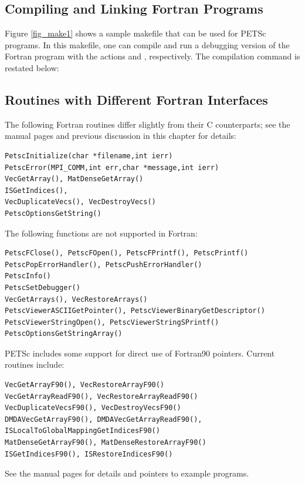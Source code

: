 \subsection{Compiling and Linking Fortran Programs}
\label{sec_fortcompile}

Figure \ref{fig_make1} shows a sample makefile that can be used for
PETSc programs.  In this makefile, one can compile and run a debugging version
of the Fortran program  with the actions    and
 , respectively. The compilation command is restated below:
\begin{makelisting}
ex3: ex3.o
       -${FLINKER}} -o ex3 ex3.o ${PETSC_LIB}
        ${RM} ex3.o
\end{makelisting}

\subsection{Routines with Different Fortran Interfaces}
\label{sec_fortran_exceptions}

The following Fortran routines differ slightly from their C counterparts; see the
manual pages and previous discussion in this chapter for details:
\begin{lstlisting}
PetscInitialize(char *filename,int ierr)
PetscError(MPI_COMM,int err,char *message,int ierr)
VecGetArray(), MatDenseGetArray()
ISGetIndices(),
VecDuplicateVecs(), VecDestroyVecs()
PetscOptionsGetString()
\end{lstlisting}
The following functions are not supported in Fortran:
\begin{lstlisting}
PetscFClose(), PetscFOpen(), PetscFPrintf(), PetscPrintf()
PetscPopErrorHandler(), PetscPushErrorHandler()
PetscInfo()
PetscSetDebugger()
VecGetArrays(), VecRestoreArrays()
PetscViewerASCIIGetPointer(), PetscViewerBinaryGetDescriptor()
PetscViewerStringOpen(), PetscViewerStringSPrintf()
PetscOptionsGetStringArray()
\end{lstlisting}

PETSc includes some support for direct use of Fortran90 pointers.
Current routines include:
\begin{lstlisting}
VecGetArrayF90(), VecRestoreArrayF90()
VecGetArrayReadF90(), VecRestoreArrayReadF90()
VecDuplicateVecsF90(), VecDestroyVecsF90()
DMDAVecGetArrayF90(), DMDAVecGetArrayReadF90(), ISLocalToGlobalMappingGetIndicesF90()
MatDenseGetArrayF90(), MatDenseRestoreArrayF90()
ISGetIndicesF90(), ISRestoreIndicesF90()
\end{lstlisting}
See the manual pages for details and pointers to example programs.

